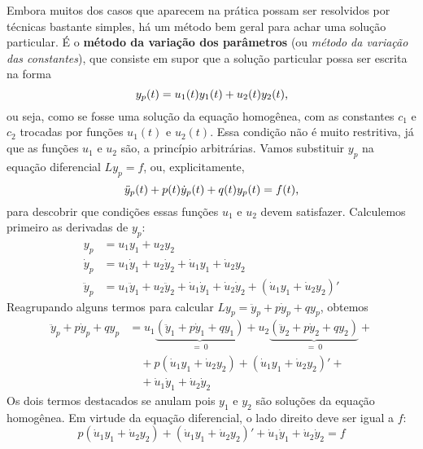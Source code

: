 \documentclass[12pt,a4paper,oneside]{memoir}
\begin{document}
Embora muitos dos casos que aparecem na prática possam ser resolvidos por técnicas bastante simples, há um método bem geral para achar uma solução particular.  É o \textbf{método da variação dos parâmetros} (ou \emph{método da variação das constantes}), que consiste em supor que a solução particular possa ser escrita na forma
\begin{equation}
  y_p(t) = u_1(t) y_1(t) + u_2(t) y_2(t) \text,
\end{equation}
ou seja, como se fosse uma solução da equação homogênea, com as constantes $c_1$ e $c_2$ trocadas por funções $u_1(t)$ e $u_2(t)$.  Essa condição não é muito restritiva, já que as funções $u_1$ e $u_2$ são, a princípio arbitrárias.  Vamos substituir $y_p$ na equação diferencial $Ly_p = f$, ou, explicitamente,
\begin{equation}
  \ddot{y}_p(t) + p(t) \dot{y}_p(t) + q(t) y_p(t) = f(t)
  \text,
\end{equation}
para descobrir que condições essas funções $u_1$ e $u_2$ devem satisfazer.  Calculemos primeiro as derivadas de $y_p$:
%
\begin{align}
  y_p &=
    u_1 y_1 + u_2 y_2 \\
%
\label{mvp-dyp}
  \dot{y}_p &=
    u_1 \dot{y}_1 + u_2 \dot{y}_2 + \dot{u}_1 y_1 + \dot{u}_2 y_2 \\
%
  \ddot{y}_p &=
    u_1 \ddot{y}_1 + u_2 \ddot{y}_2 +
    \dot{u}_1 \dot{y}_1 + \dot{u}_2 \dot{y}_2 +
    (\dot{u}_1 y_1 + \dot{u}_2 y_2)'
\end{align}
%
Reagrupando alguns termos para calcular $L y_p = \ddot{y}_p + p \dot{y}_p + q y_p$, obtemos
%
\begin{equation}
\begin{aligned}
  \ddot{y}_p + p \dot{y}_p + q y_p &=
    u_1 \underbrace{(\ddot{y}_1 + p \dot{y}_1 + q y_1)}_{=\:0} +
    u_2 \underbrace{(\ddot{y}_2 + p \dot{y}_2 + q y_2)}_{=\:0} + \\
    & \quad+
    p (\dot{u}_1 y_1 + \dot{u}_2 y_2) +
    (\dot{u}_1 y_1 + \dot{u}_2 y_2)' + \\
    & \quad+
    \dot{u}_1 \dot{y}_1 + \dot{u}_2 \dot{y}_2
\end{aligned}
\end{equation}
Os dois termos destacados se anulam pois $y_1$ e $y_2$ são soluções da equação homogênea.  Em virtude da equação diferencial, o lado direito deve ser igual a $f$:
\begin{equation}
\label{mvp-Lyp}
  p (\dot{u}_1 y_1 + \dot{u}_2 y_2) +
  (\dot{u}_1 y_1 + \dot{u}_2 y_2)' + 
  \dot{u}_1 \dot{y}_1 + \dot{u}_2 \dot{y}_2
  = f
\end{equation}
\end{document}
